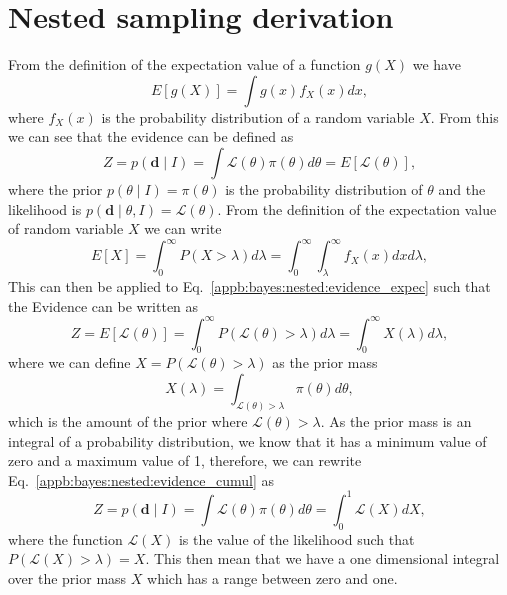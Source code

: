 \chapter{\label{appb}Nested sampling derivation}

From the definition of the expectation value of a function $g(X)$ we
have
\begin{equation}
  \label{appb:bayes:nested:exectationg}
  E[ g(X) ] = \int g(x) f_X(x) dx,
\end{equation}
where $f_X(x)$ is the probability distribution of a random variable
$X$.
From this we can see that the evidence can be defined as
\begin{equation}
  \label{appb:bayes:nested:evidence_expec}
  Z = p(\bm{d} \mid I) = \int \mathcal{L}(\theta) \pi(\theta) d\theta
  = E [ \mathcal{L}(\theta)],
\end{equation}
where the prior $p(\theta \mid I) = \pi(\theta)$ is the probability
distribution of $\theta$ and the likelihood is $p(\bm{d} \mid \theta,
I) = \mathcal{L}(\theta)$.
From the definition of the expectation value of random variable $X$ we
can write
\begin{equation}
  \label{appb:bayes:nested:exectationx}
  E[X] = \int_0^{\infty} P(X > \lambda) d\lambda = \int_0^{\infty}
  \int_{\lambda}^{\infty} f_X(x) dx d\lambda,
\end{equation}
This can then be applied to
Eq.~\ref{appb:bayes:nested:evidence_expec} such that the Evidence
can be written as
\begin{equation}
  \label{appb:bayes:nested:evidence_cumul}
  Z = E[\mathcal{L}(\theta)] = \int_0^{\infty}  P(\mathcal{L}(\theta)
  > \lambda) d\lambda = \int_0^{\infty}  X(\lambda) d\lambda ,
\end{equation}
where we can define $X = P(\mathcal{L}(\theta) > \lambda)$ as the
prior mass
\begin{equation}
  \label{appb:bayes:nested:priormass}
  X(\lambda) = \int_{\mathcal{L}(\theta) > \lambda} \pi(\theta)
  d\theta,
\end{equation}
which is the amount of the prior where $\mathcal{L}(\theta) >
\lambda$.
As the prior mass is an integral of a probability distribution, we
know that it has a minimum value of zero and a maximum value of 1,
therefore, we can rewrite
Eq.~\ref{appb:bayes:nested:evidence_cumul} as
\begin{equation}
  \label{appb:bayes:nested:evidence}
  Z = p(\bm{d} \mid I) = \int \mathcal{L}(\theta) \pi(\theta) d\theta
  = \int_0^1 \mathcal{L}(X) dX,
\end{equation}
where the function $\mathcal{L}(X)$ is the value of the likelihood
such that $P(\mathcal{L}(X) > \lambda) = X$.
This then mean that we have a one dimensional integral over the prior
mass $X$ which has a range between zero and one.